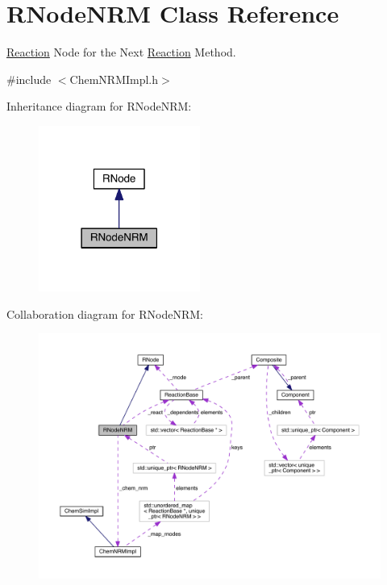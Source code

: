 \hypertarget{classRNodeNRM}{\section{R\+Node\+N\+R\+M Class Reference}
\label{classRNodeNRM}
}


\hyperlink{classReaction}{Reaction} Node for the Next \hyperlink{classReaction}{Reaction} Method.  




{\ttfamily \#include $<$Chem\+N\+R\+M\+Impl.\+h$>$}



Inheritance diagram for R\+Node\+N\+R\+M\+:\nopagebreak
\begin{figure}[H]
\begin{center}
\leavevmode
\includegraphics[width=150pt]{classRNodeNRM__inherit__graph}
\end{center}
\end{figure}


Collaboration diagram for R\+Node\+N\+R\+M\+:
\nopagebreak
\begin{figure}[H]
\begin{center}
\leavevmode
\includegraphics[width=350pt]{classRNodeNRM__coll__graph}
\end{center}
\end{figure}
